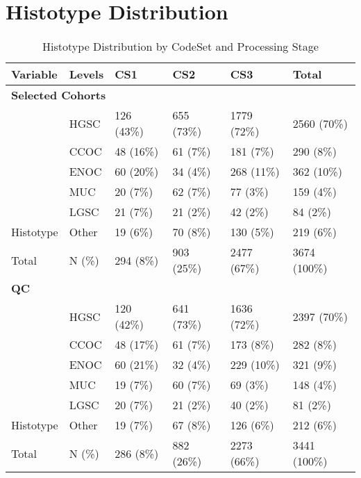 \documentclass[
]{report}
\begin{document}
\section{Histotype Distribution}\label{histotype-distribution}

\begin{table}

\caption{\label{tab:hist-codeset}Histotype Distribution by CodeSet and Processing Stage}
\centering
\begin{tabular}[t]{l|l|l|l|l|l}
\hline
Variable & Levels & CS1 & CS2 & CS3 & Total\\
\hline
\multicolumn{6}{l}{\textbf{Selected Cohorts}}\\
\hline
 & HGSC & 126 (43\%) & 655 (73\%) & 1779 (72\%) & 2560 (70\%)\\
\cline{2-6}
 & CCOC & 48 (16\%) & 61 (7\%) & 181 (7\%) & 290 (8\%)\\
\cline{2-6}
 & ENOC & 60 (20\%) & 34 (4\%) & 268 (11\%) & 362 (10\%)\\
\cline{2-6}
 & MUC & 20 (7\%) & 62 (7\%) & 77 (3\%) & 159 (4\%)\\
\cline{2-6}
 & LGSC & 21 (7\%) & 21 (2\%) & 42 (2\%) & 84 (2\%)\\
\cline{2-6}
\multirow{-6}{*}{\raggedright\arraybackslash \hspace{1em}Histotype} & Other & 19 (6\%) & 70 (8\%) & 130 (5\%) & 219 (6\%)\\
\cline{1-6}
\hspace{1em}Total & N (\%) & 294 (8\%) & 903 (25\%) & 2477 (67\%) & 3674 (100\%)\\
\cline{1-6}
\multicolumn{6}{l}{\textbf{QC}}\\
\hline
 & HGSC & 120 (42\%) & 641 (73\%) & 1636 (72\%) & 2397 (70\%)\\
\cline{2-6}
 & CCOC & 48 (17\%) & 61 (7\%) & 173 (8\%) & 282 (8\%)\\
\cline{2-6}
 & ENOC & 60 (21\%) & 32 (4\%) & 229 (10\%) & 321 (9\%)\\
\cline{2-6}
 & MUC & 19 (7\%) & 60 (7\%) & 69 (3\%) & 148 (4\%)\\
\cline{2-6}
 & LGSC & 20 (7\%) & 21 (2\%) & 40 (2\%) & 81 (2\%)\\
\cline{2-6}
\multirow{-6}{*}{\raggedright\arraybackslash \hspace{1em}Histotype} & Other & 19 (7\%) & 67 (8\%) & 126 (6\%) & 212 (6\%)\\
\cline{1-6}
\hspace{1em}Total & N (\%) & 286 (8\%) & 882 (26\%) & 2273 (66\%) & 3441 (100\%)\\

\end{tabular}
\end{table}
\end{document}
